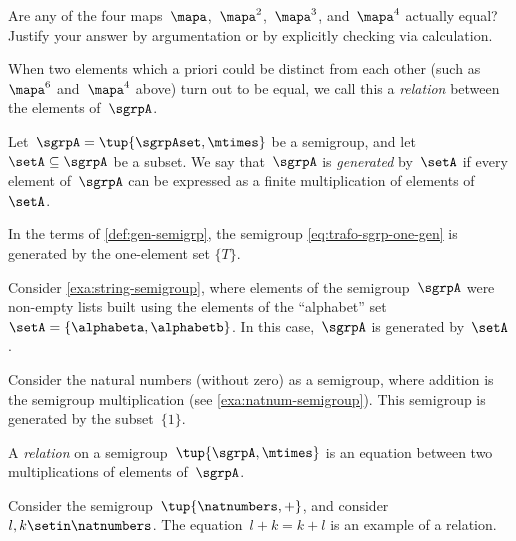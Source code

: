 \begin{gradedexercise}
    \label{ex:CheckRelations}
    Are any of the four maps~$\mapa$,~$\mapa^2$,~$\mapa^3$, and~$\mapa^4$ actually equal?
    Justify your answer by argumentation or by explicitly checking via calculation.
\end{gradedexercise}

When two elements which a priori could be distinct from each other (such as~$\mapa^6$ and~$\mapa^4$ above) turn out to be equal, we call this a \emph{relation} between the elements of~$\sgrpA$.

\begin{ctdefinition}
    \label{def:gen-semigrp}
    Let~$\sgrpA = \tup{\sgrpAset, \mtimes}$ be a semigroup, and let~$\setA \subseteq \sgrpA$ be a subset.
    We say that~$\sgrpA$ is \emph{generated} by~$\setA$ if every element of~$\sgrpA$ can be expressed as a finite multiplication of elements of~$\setA$.
\end{ctdefinition}

\begin{remark}
    In the terms of \cref{def:gen-semigrp}, the semigroup \cref{eq:trafo-sgrp-one-gen} is generated by the one-element set $\{ T \}$.
\end{remark}

\begin{example}
    Consider \cref{exa:string-semigroup}, where elements of the semigroup~$\sgrpA$ were non-empty lists built using the elements of the ``alphabet'' set~$\setA = \{ \alphabeta, \alphabetb\}$.
    In this case,~$\sgrpA$ is generated by~$\setA$.
\end{example}

\begin{example}
    Consider the natural numbers (without zero) as a semigroup, where addition is the semigroup multiplication (see \cref{exa:natnum-semigroup}).
    This semigroup is generated by the subset~$\{1 \}$.
\end{example}

\begin{ctdefinition}
    A \emph{relation} on a semigroup~$\tup{\sgrpA, \mtimes}$ is an equation between two multiplications of elements of~$\sgrpA$.
\end{ctdefinition}

\begin{example}
    Consider the semigroup~$\tup{\natnumbers, +}$, and consider~$l, k \setin \natnumbers$.
    The equation~$l + k = k + l$ is an example of a relation.
\end{example}


